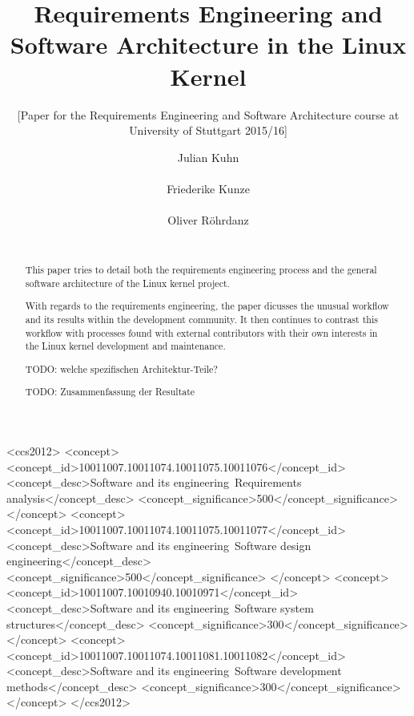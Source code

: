 \documentclass{sig-alternate-05-2015}
\begin{document}
\title{Requirements Engineering and Software Architecture in the Linux Kernel}
\subtitle{[Paper for the Requirements Engineering and Software Architecture course at University of Stuttgart 2015/16]}

\author{
    \alignauthor Julian Kuhn\\
        \\
    \alignauthor Friederike Kunze\\
        \\
    \alignauthor Oliver R{\"o}hrdanz\\
        \\
}

\maketitle

\begin{abstract}

This paper tries to detail both the requirements engineering process and the general software architecture of the Linux kernel project.

With regards to the requirements engineering, the paper dicusses the unusual workflow and its results within the development community.
It then continues to contrast this workflow with processes found with external contributors with their own interests in the Linux kernel development and maintenance.

TODO: welche spezifischen Architektur-Teile?

TODO: Zusammenfassung der Resultate

\end{abstract}

%
 \begin{CCSXML}
<ccs2012>
<concept>
<concept_id>10011007.10011074.10011075.10011076</concept_id>
<concept_desc>Software and its engineering~Requirements analysis</concept_desc>
<concept_significance>500</concept_significance>
</concept>
<concept>
<concept_id>10011007.10011074.10011075.10011077</concept_id>
<concept_desc>Software and its engineering~Software design engineering</concept_desc>
<concept_significance>500</concept_significance>
</concept>
<concept>
<concept_id>10011007.10010940.10010971</concept_id>
<concept_desc>Software and its engineering~Software system structures</concept_desc>
<concept_significance>300</concept_significance>
</concept>
<concept>
<concept_id>10011007.10011074.10011081.10011082</concept_id>
<concept_desc>Software and its engineering~Software development methods</concept_desc>
<concept_significance>300</concept_significance>
</concept>
</ccs2012>
\end{CCSXML}
\end{document}
